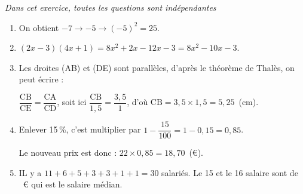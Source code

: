 \emph{Dans cet exercice, toutes les questions sont indépendantes}

\medskip

\begin{enumerate}
\item On obtient $- 7 \to - 5 \to (- 5)^2 = 25$.


\item %

$(2x - 3)(4x + 1) = 8x^2 + 2x  - 12x  - 3 = 8x^2 - 10x  - 3$.
\item Les droites (AB) et (DE) sont parallèles, d'après le théorème de Thalès, on peut écrire :

$\dfrac{\text{CB}}{\text{CE}} = \dfrac{\text{CA}}{\text{CD}}$, soit ici $\dfrac{\text{CB}}{1,5} = \dfrac{3,5}{1}$, d'où $\text{CB} = 3,5 \times 1,5 = 5,25$~(cm).

\item %

Enlever 15\,\%, c'est multiplier par $1 - \dfrac{15}{100} = 1 - 0,15 = 0,85$.

Le nouveau prix est donc : $22 \times 0,85 = 18,70$~(\euro).
\item %

%
IL y a $11 + 6 + 5 + 3 + 3 + 1 + 1 = 30$ salariés. Le 15 et le 16 salaire sont de ~\euro{} qui est le salaire médian.


\end{enumerate}
